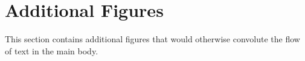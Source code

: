 

\section{Additional Figures}

This section contains additional figures that would otherwise convolute the flow of text in the main body.


